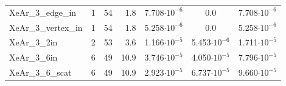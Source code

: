 \begin{table}
\begin{tabular}{lrrrccc}
XeAr\_3\_edge\_in    &      1   &     54   &  1.8  & 7.708$\cdot 10^{-6}$ & 0.0                  & 7.708$\cdot 10^{-6}$ \\
XeAr\_3\_vertex\_in  &      1   &     54   &  1.8  & 5.258$\cdot 10^{-6}$ & 0.0                  & 5.258$\cdot 10^{-6}$ \\
XeAr\_3\_2in         &      2   &     53   &  3.6  & 1.166$\cdot 10^{-5}$ & 5.453$\cdot 10^{-6}$ & 1.711$\cdot 10^{-5}$ \\
XeAr\_3\_6in         &      6   &     49   & 10.9  & 3.746$\cdot 10^{-5}$ & 4.050$\cdot 10^{-5}$ & 7.796$\cdot 10^{-5}$ \\
XeAr\_3\_6\_scat     &      6   &     49   & 10.9  & 2.923$\cdot 10^{-5}$ & 6.737$\cdot 10^{-5}$ & 9.660$\cdot 10^{-5}$ \\
\bottomrule
\end{tabular}
\label{table:theo_gammas}
\end{table}

